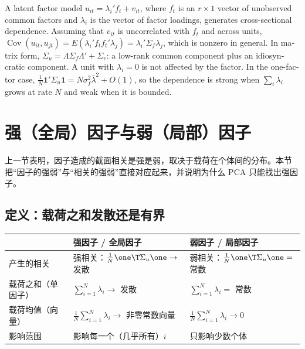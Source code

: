 \begin{english}
A latent factor model $u_{it}=\lambda_i'f_t+v_{it}$, where $f_t$ is an $r\times1$ vector of unobserved common factors and $\lambda_i$ is the vector of factor loadings, generates cross-sectional dependence. Assuming that $v_{it}$ is uncorrelated with $f_t$ and across units, $\operatorname{Cov}(u_{it},u_{jt})=E(\lambda_i'f_tf_t'\lambda_j)=\lambda_i'\Sigma_f\lambda_j$, which is nonzero in general. In matrix form, $\Sigma_u=\Lambda\Sigma_f\Lambda'+\Sigma_v$: a low-rank common component plus an idiosyncratic component. A unit with $\lambda_i=0$ is not affected by the factor. In the one-factor case, $\frac1N\mathbf 1'\Sigma_u\mathbf 1=N\sigma_f^2\bar\lambda^2+O(1)$, so the dependence is strong when $\sum_i\lambda_i$ grows at rate $N$ and weak when it is bounded.
\end{english}

\section{强（全局）因子与弱（局部）因子}\label{sec:U13a-sfwf}

上一节表明，因子造成的截面相关是强是弱，取决于载荷在个体间的分布。本节把“因子的强弱”与“相关的强弱”直接对应起来，并说明为什么 PCA 只能找出强因子。

\subsection{定义：载荷之和发散还是有界}

\begin{center}
\small
\begin{tabularx}{\linewidth}{@{}l L L@{}}
\toprule
 & 强因子 / 全局因子 & 弱因子 / 局部因子\\
\midrule
产生的相关 & 强相关：$\frac1N\one\T\Sigma_u\one\to$ 发散 & 弱相关：$\frac1N\one\T\Sigma_u\one=$ 常数\\
载荷之和（单因子） & $\sum_{i=1}^N\lambda_i\to$ 发散 & $\sum_{i=1}^N\lambda_i=$ 常数\\
载荷均值（向量） & $\frac1N\sum_{i=1}^N\lambda_i\to$ 非零常数向量 & $\frac1N\sum_{i=1}^N\lambda_i\to0$\\
影响范围 & 影响每一个（几乎所有）$i$ & 只影响少数个体\\
\bottomrule
\end{tabularx}
\label{tab:U13a-sfwf}
\end{center}

